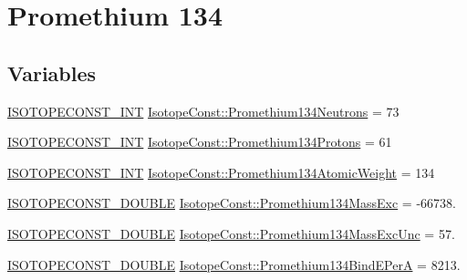 \hypertarget{group___isotope_const-_promethium-_pm134}{}\section{Promethium 134}
\label{group___isotope_const-_promethium-_pm134}
\subsection*{Variables}
\begin{DoxyCompactItemize}
\item 
\mbox{\hyperlink{group___isotope_const-_macros_ga5f18360b3e99483a35c32d789e62621c}{I\+S\+O\+T\+O\+P\+E\+C\+O\+N\+S\+T\+\_\+\+I\+NT}} \mbox{\hyperlink{group___isotope_const-_promethium-_pm134_ga8b475bcab6363b5681cfc2ffe3749ce9}{Isotope\+Const\+::\+Promethium134\+Neutrons}} = 73
\item 
\mbox{\hyperlink{group___isotope_const-_macros_ga5f18360b3e99483a35c32d789e62621c}{I\+S\+O\+T\+O\+P\+E\+C\+O\+N\+S\+T\+\_\+\+I\+NT}} \mbox{\hyperlink{group___isotope_const-_promethium-_pm134_ga79a70a2f35795723600788b958fd87d8}{Isotope\+Const\+::\+Promethium134\+Protons}} = 61
\item 
\mbox{\hyperlink{group___isotope_const-_macros_ga5f18360b3e99483a35c32d789e62621c}{I\+S\+O\+T\+O\+P\+E\+C\+O\+N\+S\+T\+\_\+\+I\+NT}} \mbox{\hyperlink{group___isotope_const-_promethium-_pm134_gac8820af5deab0b9e66a4c42327fabe10}{Isotope\+Const\+::\+Promethium134\+Atomic\+Weight}} = 134
\item 
\mbox{\hyperlink{group___isotope_const-_macros_ga8f45a7272ce02c0b4c65c44636ed719a}{I\+S\+O\+T\+O\+P\+E\+C\+O\+N\+S\+T\+\_\+\+D\+O\+U\+B\+LE}} \mbox{\hyperlink{group___isotope_const-_promethium-_pm134_gab2fb5fc0dc3c6dde9aa07d671d882900}{Isotope\+Const\+::\+Promethium134\+Mass\+Exc}} = -\/66738.
\item 
\mbox{\hyperlink{group___isotope_const-_macros_ga8f45a7272ce02c0b4c65c44636ed719a}{I\+S\+O\+T\+O\+P\+E\+C\+O\+N\+S\+T\+\_\+\+D\+O\+U\+B\+LE}} \mbox{\hyperlink{group___isotope_const-_promethium-_pm134_gad77dc293c376a79c5531384ff37d4bea}{Isotope\+Const\+::\+Promethium134\+Mass\+Exc\+Unc}} = 57.
\item 
\mbox{\hyperlink{group___isotope_const-_macros_ga8f45a7272ce02c0b4c65c44636ed719a}{I\+S\+O\+T\+O\+P\+E\+C\+O\+N\+S\+T\+\_\+\+D\+O\+U\+B\+LE}} \mbox{\hyperlink{group___isotope_const-_promethium-_pm134_ga15d1b2e19480997a9b3d8e05e141eb06}{Isotope\+Const\+::\+Promethium134\+Bind\+E\+PerA}} = 8213.

\end{DoxyCompactItemize}
